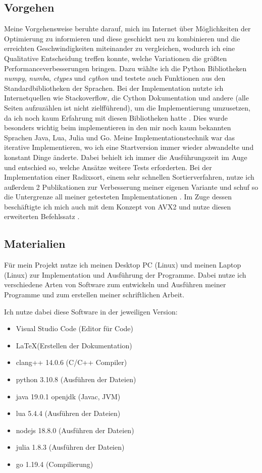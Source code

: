 \documentclass[12pt,a4paper]{article}
\begin{document}
\subsection{Vorgehen}
Meine Vorgehensweise beruhte darauf, mich im Internet über Möglichkeiten der Optimierung zu informieren und
diese geschickt neu zu kombinieren und die erreichten Geschwindigkeiten miteinander zu vergleichen, wodurch
ich eine Qualitative Entscheidung treffen konnte, welche Variationen die größten Performanceverbesserungen bringen.
Dazu wählte ich die Python Bibliotheken \textit{numpy}, \textit{numba}, \textit{ctypes} und \textit{cython} und
testete auch Funktionen aus den Standardbibliotheken der Sprachen.
Bei der Implementation nutzte ich Internetquellen wie Stackoverflow, die Cython Dokumentation und andere 
(alle Seiten aufzuzählen ist nicht zielfführend), um die Implementierung umzusetzen, 
da ich noch kaum Erfahrung mit diesen Bibliotheken hatte \cite{stackoverflow} \cite{cythondocs}.
Dies wurde besonders wichtig beim implementieren in den mir noch kaum bekannten Sprachen Java, Lua, Julia und Go.
Meine Implementationstechnik war das iterative Implementieren, wo ich eine Startversion immer wieder abwandelte und
konstant Dinge änderte. Dabei behielt ich immer die Ausführungszeit im Auge und entschied so, welche Ansätze
weitere Tests erforderten.
Bei der Implementation einer Radixsort, einem sehr schnellen Sortierverfahren, nutze ich außerdem 2 Publikationen 
zur Verbesserung meiner eigenen Variante und schuf so die Untergrenze all meiner getesteten Implementationen
\cite{terdiman} \cite{michael}.
Im Zuge dessen beschäftigte ich mich auch mit dem Konzept von AVX2 und nutze diesen erweiterten Befehlssatz
\cite{intelavxdocs} \cite{avxguide}.

\clearpage

\subsection{Materialien}
Für mein Projekt nutze ich meinen Desktop PC (Linux) und meinen Laptop (Linux) zur Implementation und Ausführung der Programme.
Dabei nutze ich verschiedene Arten von Software zum entwickeln und Ausführen meiner Programme und zum erstellen meiner
schriftlichen Arbeit.

Ich nutze dabei diese Software in der jeweiligen Version:
\begin{itemize}
    \item Visual Studio Code (Editor für Code)
    \item \LaTeX (Erstellen der Dokumentation)
    \item clang++ 14.0.6 (C/C++ Compiler)
    \item python 3.10.8 (Ausführen der Dateien)
    \item java 19.0.1 openjdk (Javac, JVM)
    \item lua 5.4.4 (Ausführen der Dateien)
    \item nodejs 18.8.0 (Ausführen der Dateien)
    \item julia 1.8.3 (Ausführen der Dateien)
    \item go 1.19.4 (Compilierung)
\end{itemize}
\end{document}
